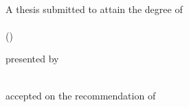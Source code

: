 \begin{titlepage}

    \begin{center}
        \large
        \begingroup
        \endgroup

        \hfill

        \vfill

        \begingroup
            \spacedallcaps{\myTitle}%
            \ifx\mySubtitle\empty\else\\\vspace{5pt}\spacedallcaps{\footnotesize \mySubtitle}\fi
        \endgroup

        \vfill

        \begingroup
            A thesis submitted to attain the degree of\\
            \vspace{0.5em}
            \spacedallcaps{\myDegreeName}\\
            (\myDegreeInstitution)
        \endgroup

        \vfill

        \begingroup
            presented by\\
            \vspace{0.5em}
            \spacedallcaps{\normalsize \myName}\\
            \vspace{0.5em}
            \myBirthInfo
        \endgroup

        \vfill

        \begingroup
            accepted on the recommendation of\\
            \vspace{0.5em}
            \myCommittee
        \endgroup

        \vfill

        \myYear

        \vfill
    \end{center}

\end{titlepage}
